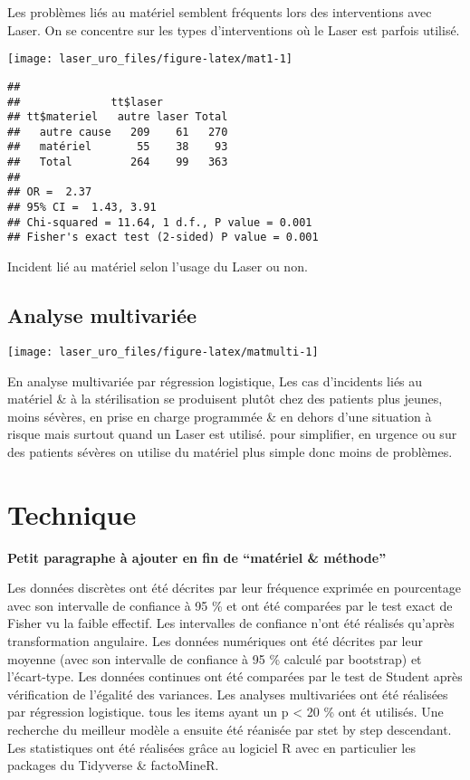 \documentclass[a4paper,fontsize=10pt,french]{scrartcl}
\begin{document}
Les problèmes liés au matériel semblent fréquents lors des interventions
avec Laser. On se concentre sur les types d'interventions où le Laser
est parfois utilisé.

\texttt{[image: laser\_uro\_files/figure-latex/mat1-1]}

\begin{verbatim}
## 
##              tt$laser
## tt$materiel   autre laser Total
##   autre cause   209    61   270
##   matériel       55    38    93
##   Total         264    99   363
## 
## OR =  2.37 
## 95% CI =  1.43, 3.91  
## Chi-squared = 11.64, 1 d.f., P value = 0.001
## Fisher's exact test (2-sided) P value = 0.001
\end{verbatim}

Incident lié au matériel selon l'usage du Laser ou non.

\subsection{Analyse multivariée}\label{analyse-multivariuxe9e}

\texttt{[image: laser\_uro\_files/figure-latex/matmulti-1]}

En analyse multivariée par régression logistique, Les cas d'incidents
liés au matériel \& à la stérilisation se produisent plutôt chez des
patients plus jeunes, moins sévères, en prise en charge programmée \& en
dehors d'une situation à risque mais surtout quand un Laser est utilisé.
pour simplifier, en urgence ou sur des patients sévères on utilise du
matériel plus simple donc moins de problèmes.

\section{Technique}\label{technique}

\textbf{Petit paragraphe à ajouter en fin de ``matériel \& méthode''}

Les données discrètes ont été décrites par leur fréquence exprimée en
pourcentage avec son intervalle de confiance à 95 \% et ont été
comparées par le test exact de Fisher vu la faible effectif. Les
intervalles de confiance n'ont été réalisés qu'après transformation
angulaire. Les données numériques ont été décrites par leur moyenne
(avec son intervalle de confiance à 95 \% calculé par bootstrap) et
l'écart-type. Les données continues ont été comparées par le test de
Student après vérification de l'égalité des variances. Les analyses
multivariées ont été réalisées par régression logistique. tous les items
ayant un p \textless{} 20 \% ont ét utilisés. Une recherche du meilleur
modèle a ensuite été réanisée par stet by step descendant. Les
statistiques ont été réalisées grâce au logiciel R\cite{rstat} avec
en particulier les packages du Tidyverse\cite{tidy} \&
factoMineR\cite{facto}.



\end{document}
